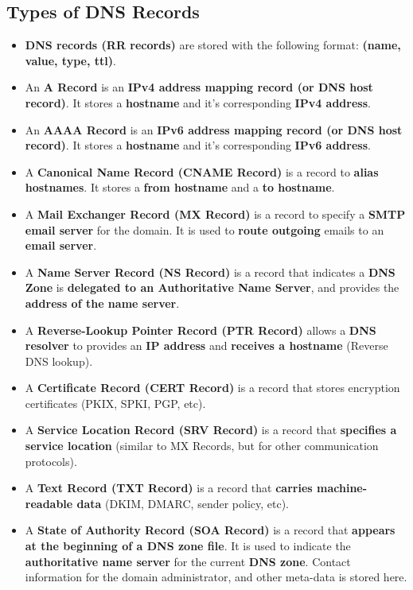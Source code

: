 \documentclass[16pt]{article}
\begin{document}
    \subsection*{Types of DNS Records}
    \begin{itemize}
        \item \textbf{DNS records (RR records)} are stored with the following format: \textbf{(name, value, type, ttl)}.
        \item An \textbf{A Record} is an \textbf{IPv4 address mapping record (or DNS host record)}. It stores a \textbf{hostname} and it's corresponding \textbf{IPv4 address}.
        \item An \textbf{AAAA Record} is an \textbf{IPv6 address mapping record (or DNS host record)}. It stores a \textbf{hostname} and it's corresponding \textbf{IPv6 address}.
        \item A \textbf{Canonical Name Record (CNAME Record)} is a record to \textbf{alias hostnames}. It stores a \textbf{from hostname} and a \textbf{to hostname}.
        \item A \textbf{Mail Exchanger Record (MX Record)} is a record to specify a \textbf{SMTP email server} for the domain. It is used to \textbf{route outgoing} emails to an \textbf{email server}.
        \item A \textbf{Name Server Record (NS Record)} is a record that indicates a \textbf{DNS Zone} is \textbf{delegated to an Authoritative Name Server}, and provides the \textbf{address of the name server}.
        \item A \textbf{Reverse-Lookup Pointer Record (PTR Record)} allows a \textbf{DNS resolver} to provides an \textbf{IP address} and \textbf{receives a hostname} (Reverse DNS lookup).
        \item A \textbf{Certificate Record (CERT Record)} is a record that stores encryption certificates (PKIX, SPKI, PGP, etc).
        \item A \textbf{Service Location Record (SRV Record)} is a record that \textbf{specifies a service location} (similar to MX Records, but for other communication protocols).
        \item A \textbf{Text Record (TXT Record)} is a record that \textbf{carries machine-readable data} (DKIM, DMARC, sender policy, etc).
        \item A \textbf{State of Authority Record (SOA Record)} is a record that \textbf{appears at the beginning of a DNS zone file}. It is used to indicate the \textbf{authoritative name server} for the current \textbf{DNS zone}. Contact information for the domain administrator, and other meta-data is stored here.
    \end{itemize}
\end{document}
